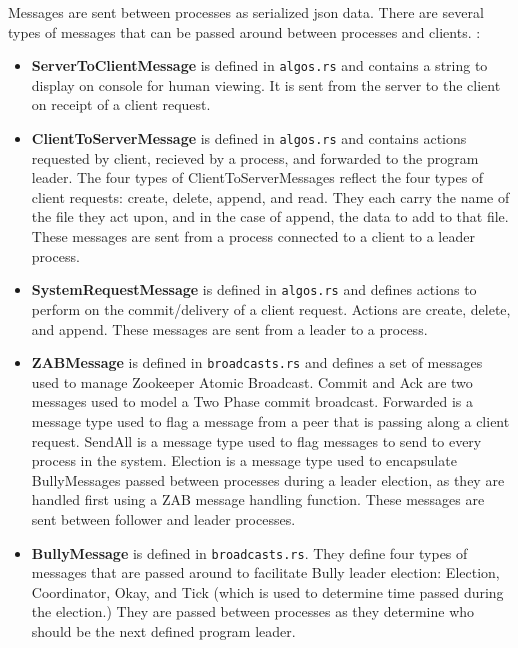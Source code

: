\documentclass{article}
\begin{document}
    Messages are sent between processes as serialized json data. There are several types of messages that can be passed around between processes and clients. :
	\begin{itemize}
	        \item\textbf{ServerToClientMessage} is defined in \verb|algos.rs| and contains a string to display on console for human viewing. It is sent from the server to the client on receipt of a client request.
	        \item\textbf{ClientToServerMessage} is defined in \verb|algos.rs| and contains actions requested by client, recieved by a process, and forwarded to the program leader. The four types of ClientToServerMessages reflect the four types of client requests: create, delete, append, and read. They each carry the name of the file they act upon, and in the case of append, the data to add to that file. These messages are sent from a process connected to a client to a leader process.
	        \item\textbf{SystemRequestMessage} is defined in \verb|algos.rs| and defines actions to perform on the commit/delivery of a client request. Actions are create, delete, and append. These messages are sent from a leader to a process.
	        \item\textbf{ZABMessage} is defined in \verb|broadcasts.rs| and defines a set of messages used to manage Zookeeper Atomic Broadcast. Commit and Ack are two messages used to model a Two Phase commit broadcast. Forwarded is a message type used to flag a message from a peer that is passing along a client request. SendAll is a message type used to flag messages to send to every process in the system. Election is a message type used to encapsulate BullyMessages passed between processes during a leader election, as they are handled first using a ZAB message handling function. These messages are sent between follower and leader processes.
	        \item\textbf{BullyMessage} is defined in \verb|broadcasts.rs|. They define four types of messages that are passed around to facilitate Bully leader election: Election, Coordinator, Okay, and Tick (which is used to determine time passed during the election.) They are passed between processes as they determine who should be the next defined program leader.
	\end{itemize}
\end{document}
